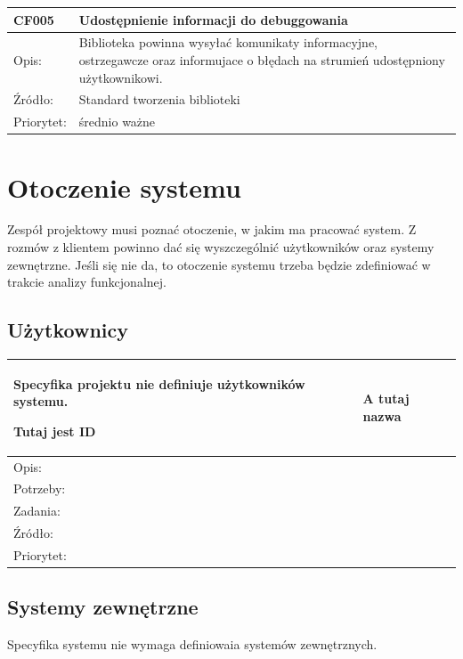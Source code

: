 \documentclass[a4paper,10pt]{article}
\begin{document}
\begin{tabular}{|p{3cm}|p{9cm}|} \hline

CF005 & Udostępnienie informacji do debuggowania  \\ \hline
Opis: &  Biblioteka powinna wysyłać komunikaty informacyjne, ostrzegawcze oraz informujace o błędach na strumień udostępniony użytkownikowi.  \\ \hline
Źródło: & Standard tworzenia biblioteki \cite{artOstandardach} \\ \hline
Priorytet: & średnio ważne \\ \hline

\end{tabular}



\section{Otoczenie systemu}

Zespół projektowy musi poznać otoczenie, w jakim ma pracować system. Z rozmów z klientem powinno dać się wyszczególnić użytkowników oraz systemy zewnętrzne. Jeśli się nie da, to otoczenie systemu trzeba będzie zdefiniować w trakcie analizy funkcjonalnej.

\subsection{Użytkownicy}


\begin{tabular}{|p{3cm}|p{9cm}|} \hline

Specyfika projektu nie definiuje użytkowników systemu.

Tutaj jest ID & A tutaj nazwa \\ \hline
Opis: &  \\ \hline
Potrzeby: &  \\ \hline
Zadania: &  \\ \hline
Źródło: &  \\ \hline
Priorytet: &  \\ \hline

\end{tabular}


\subsection{Systemy zewnętrzne}

Specyfika systemu nie wymaga definiowaia systemów zewnętrznych.
\end{document}
